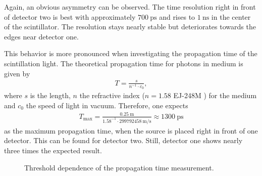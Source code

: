 Again, an obvious asymmetry can be observed. The time resolution right in front of detector two is best with approximately $\SI{700}{\pico\second}$ and rises to $\SI{1}{\nano\second}$ in the center of the scintillator. The resolution stays nearly stable but deteriorates towards the edges near detector one. \par 
This behavior is more pronounced when investigating the propagation time of the scintillation light. The theoretical propagation time for photons in medium is given by 
\begin{align}
T=\frac{s}{n^{-1}\cdot c_0},
\end{align}
where $s$ is the length, $n$ the refractive index ($n=1.58$ EJ-248M \cite{eljen}) for the medium and $c_0$ the speed of light in vacuum. Therefore, one expects
\begin{align*}
T_{\text{max}}=\frac{\SI{0.25}{\meter}}{1.58^{-1}\cdot\SI{299792458}{\meter\per\second}}\approx\SI{1300}{\pico\second}
\end{align*}
as the maximum propagation time, when the source is placed right in front of one detector. This can be found for detector two. Still, detector one shows nearly three times the expected result. \par 
\begin{figure}[t!]
	\centering
	\hfill
	\hfill
	\caption[Threshold dependence of the propagation time measurement]{Threshold dependence of the propagation time measurement.}
	\label{fig:ch5:threshold_dependenecy}
\end{figure}
